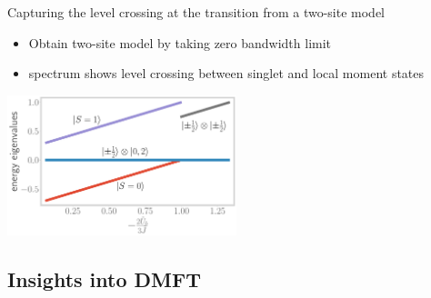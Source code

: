 \documentclass[8pt,aspectratio=169]{beamer}
\newcommand{\nitem}{\item[\ding{51}]}
\begin{document}
\begin{frame}{Capturing the level crossing at the transition from a two-site model}

\begin{itemize}
	\nitem Obtain two-site model by taking \alert{zero bandwidth} limit\\[10pt]
	\nitem spectrum shows \alert{level crossing} between singlet and local moment states
\end{itemize}

\vspace*{\fill}

\includegraphics[width=0.5\textwidth]{twosite_spectrum.pdf}
\end{frame}

\begin{frame}{}
\section{Insights into DMFT}
\end{frame}
\end{document}
